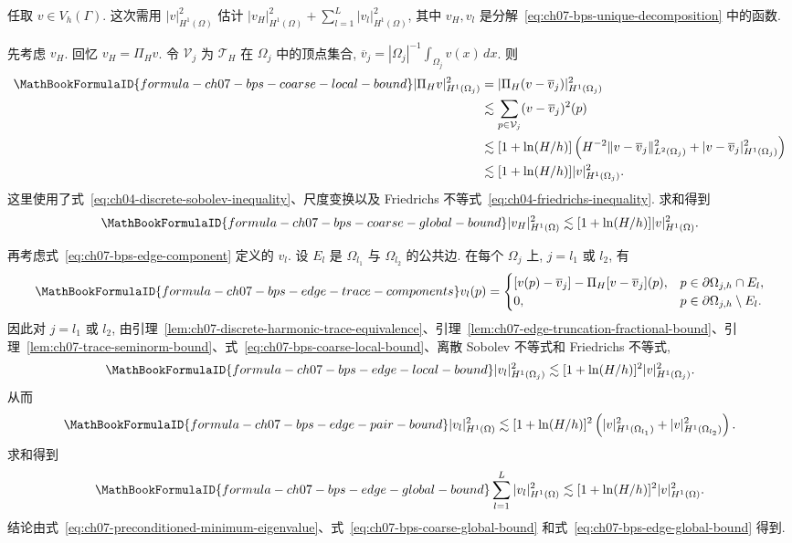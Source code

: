 \begin{Proof}
任取 $v\in V_h(\Gamma)$. 这次需用 $|v|_{H^1(\Omega)}^2$ 估计 $|v_H|_{H^1(\Omega)}^2+\sum_{l=1}^{L}|v_l|_{H^1(\Omega)}^2$, 其中 $v_H,v_l$ 是分解~\eqref{eq:ch07-bps-unique-decomposition} 中的函数.

先考虑 $v_H$. 回忆 $v_H=\Pi_Hv$. 令 $\mathcal V_j$ 为 $\mathcal T_H$ 在 $\Omega_j$ 中的顶点集合, $\overline v_j=|\Omega_j|^{-1}\int_{\Omega_j}v(x)\,dx$. 则
\begin{align}
\MathBookFormulaID{formula-ch07-bps-coarse-local-bound}
|\Pi_Hv|_{H^1(\Omega_j)}^2
&=|\Pi_H(v-\overline v_j)|_{H^1(\Omega_j)}^2\notag\\
&\lesssim\sum_{p\in\mathcal V_j}(v-\overline v_j)^2(p)\notag\\
&\lesssim[1+\ln(H/h)]
\left(H^{-2}\|v-\overline v_j\|_{L^2(\Omega_j)}^2
+|v-\overline v_j|_{H^1(\Omega_j)}^2\right)\notag\\
&\lesssim[1+\ln(H/h)]|v|_{H^1(\Omega_j)}^2.
\label{eq:ch07-bps-coarse-local-bound}
\end{align}
这里使用了式~\eqref{eq:ch04-discrete-sobolev-inequality}、尺度变换以及 Friedrichs 不等式~\eqref{eq:ch04-friedrichs-inequality}. 求和得到
\begin{equation}
\MathBookFormulaID{formula-ch07-bps-coarse-global-bound}
\label{eq:ch07-bps-coarse-global-bound}
|v_H|_{H^1(\Omega)}^2
\lesssim[1+\ln(H/h)]|v|_{H^1(\Omega)}^2.
\end{equation}

再考虑式~\eqref{eq:ch07-bps-edge-component} 定义的 $v_l$. 设 $E_l$ 是 $\Omega_{l_1}$ 与 $\Omega_{l_2}$ 的公共边. 在每个 $\Omega_j$ 上, $j=l_1$ 或 $l_2$, 有
\[
\MathBookFormulaID{formula-ch07-bps-edge-trace-components}
v_l(p)=
\begin{cases}
[v(p)-\overline v_j]-\Pi_H[v-\overline v_j](p),
&p\in\partial\Omega_{j,h}\cap E_l,\\
0,&p\in\partial\Omega_{j,h}\setminus E_l.
\end{cases}
\]
因此对 $j=l_1$ 或 $l_2$, 由引理~\ref{lem:ch07-discrete-harmonic-trace-equivalence}、引理~\ref{lem:ch07-edge-truncation-fractional-bound}、引理~\ref{lem:ch07-trace-seminorm-bound}、式~\eqref{eq:ch07-bps-coarse-local-bound}、离散 Sobolev 不等式和 Friedrichs 不等式,
\[
\MathBookFormulaID{formula-ch07-bps-edge-local-bound}
|v_l|_{H^1(\Omega_j)}^2
\lesssim[1+\ln(H/h)]^2|v|_{H^1(\Omega_j)}^2.
\]
从而
\[
\MathBookFormulaID{formula-ch07-bps-edge-pair-bound}
|v_l|_{H^1(\Omega)}^2
\lesssim[1+\ln(H/h)]^2
\left(|v|_{H^1(\Omega_{l_1})}^2+|v|_{H^1(\Omega_{l_2})}^2\right).
\]
求和得到
\begin{equation}
\MathBookFormulaID{formula-ch07-bps-edge-global-bound}
\label{eq:ch07-bps-edge-global-bound}
\sum_{l=1}^{L}|v_l|_{H^1(\Omega)}^2
\lesssim[1+\ln(H/h)]^2|v|_{H^1(\Omega)}^2.
\end{equation}
结论由式~\eqref{eq:ch07-preconditioned-minimum-eigenvalue}、式~\eqref{eq:ch07-bps-coarse-global-bound} 和式~\eqref{eq:ch07-bps-edge-global-bound} 得到.
\end{Proof}

